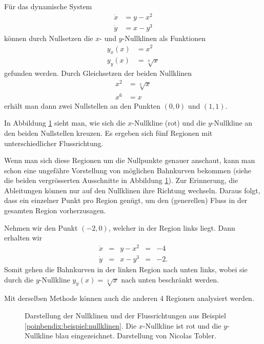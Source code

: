 \begin{beispiel} \label{poinbendix:beispiel:nullklinen}

Für das dynamische System
\begin{align*}
    \dot{x} &= y - x^2 \\
    \dot{y} &= x - y^3
\end{align*}
können durch Nullsetzen die $x$- und $y$-Nullklinen als Funktionen
\begin{align*}
    y_x(x) &= x^2 \\
    y_y(x) &= \sqrt[3]{x}
\end{align*}
gefunden werden.
Durch Gleichsetzen der beiden Nullklinen
\begin{align*}
    x^2 &= \sqrt[3]{x} \\
    x^6 &= x
\end{align*}
erhält man dann zwei Nullstellen an den Punkten $(0, 0)$ und $(1, 1)$.

In Abbildung \ref{poinbendix:fig:nullklinen} sieht man, wie sich die $x$-Nullkline (rot) und die $y$-Nullkline an den beiden Nullstellen kreuzen.
Es ergeben sich fünf Regionen mit unterschiedlicher Flussrichtung.

Wenn man sich diese Regionen um die Nullpunkte genauer anschaut, kann man schon eine ungefähre Vorstellung von möglichen Bahnkurven bekommen (siehe die beiden vergrösserten Ausschnitte in Abbildung \ref{poinbendix:fig:nullklinen}).
Zur Erinnerung, die Ableitungen können nur auf den Nullklinen ihre Richtung wechseln.
Daraus folgt, dass ein einzelner Punkt pro Region genügt, um den (generellen) Fluss in der gesamten Region vorherzusagen.

Nehmen wir den Punkt $(-2, 0)$, welcher in der Region links liegt.
Dann erhalten wir
\[
\renewcommand{\arraycolsep}{3pt}
\begin{array}{rcccl}
\dot{x} &=& y-x^2 &=&-4 \\
\dot{y} &=& x-y^3 &=&-2.
\end{array}
\]
Somit gehen die Bahnkurven in der linken Region nach unten links, wobei sie durch die $y$-Nullkline $y_y(x) = \sqrt[3]{x}$ nach unten beschränkt werden.

Mit derselben Methode können auch die anderen 4 Regionen analysiert werden.
\end{beispiel}

\begin{figure}
    \centering
    
    \caption{Darstellung der Nullklinen und der Flussrichtungen aus Beispiel \ref{poinbendix:beispiel:nullklinen}. Die $x$-Nullkline ist rot und die $y$-Nullkline blau eingezeichnet. Darstellung von Nicolas Tobler.}
    \label{poinbendix:fig:nullklinen}
\end{figure}

